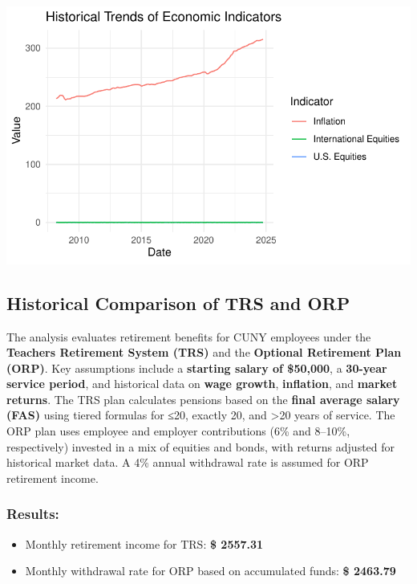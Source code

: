 \documentclass[
  letterpaper,
  DIV=11,
  numbers=noendperiod]{scrartcl}
\begin{document}
\includegraphics{mp04_files/figure-pdf/unnamed-chunk-8-1.pdf}

\subsection{Historical Comparison of TRS and
ORP}\label{historical-comparison-of-trs-and-orp}

The analysis evaluates retirement benefits for CUNY employees under the
\textbf{Teachers Retirement System (TRS)} and the \textbf{Optional
Retirement Plan (ORP)}. Key assumptions include a \textbf{starting
salary of \$50,000}, a \textbf{30-year service period}, and historical
data on \textbf{wage growth}, \textbf{inflation}, and \textbf{market
returns}. The TRS plan calculates pensions based on the \textbf{final
average salary (FAS)} using tiered formulas for ≤20, exactly 20, and
\textgreater20 years of service. The ORP plan uses employee and employer
contributions (6\% and 8--10\%, respectively) invested in a mix of
equities and bonds, with returns adjusted for historical market data. A
4\% annual withdrawal rate is assumed for ORP retirement income.

\subsubsection{Results:}\label{results}

\begin{itemize}
\item
  Monthly retirement income for TRS: \textbf{\$ 2557.31}
\item
  Monthly withdrawal rate for ORP based on accumulated funds: \textbf{\$
  2463.79}
\end{itemize}
\end{document}
